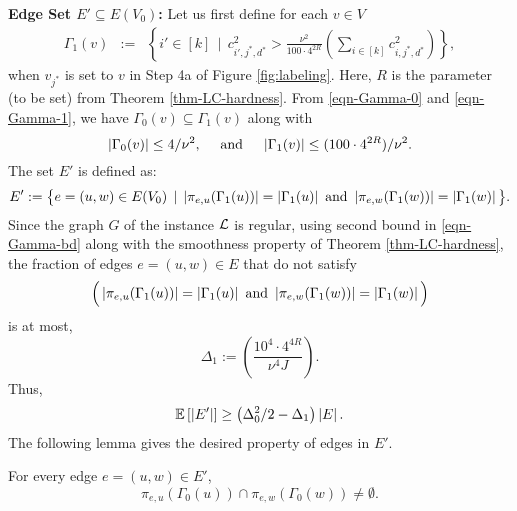 \medskip
\noindent
{\bf Edge Set $E' \subseteq E(V_0)$:} 
Let us first define for each $v \in V$
\begin{eqnarray}
\Gamma_1(v) & := & \left\{i' \in [k]\,\mid\, c_{i',j^*,d^*}^2 >
\frac{\nu^2}{100\cdot 4^{2R}}\left(\sum_{i \in [k]}
c_{i,j^*,d^*}^2\right)\right\},
\label{eqn-Gamma-1}
\end{eqnarray}
when $v_{j^*}$ is set to $v$ in Step 4a of Figure \ref{fig:labeling}.
Here,  $R$ is the parameter (to be set) from Theorem
\ref{thm-LC-hardness}.
From \eqref{eqn-Gamma-0} and \eqref{eqn-Gamma-1}, we have $\Gamma_0(v) \subseteq \Gamma_1(v)$ along with
\begin{equation}\label{eqn-Gamma-bd}
\left|\Gamma_0(v)\right| \leq 4/\nu^2, \ \ \ \tn{ and } \ \ \ \left|\Gamma_1(v)\right| \leq (100\cdot4^{2R})/\nu^2.
\end{equation}
The set $E'$ is defined as:
\begin{equation}\label{eqn-edgesEprime}
E' := \big\{e = (u,w) \in E(V_0)\,\mid\, \left|\pi_{e,u}(\Gamma_1(u))\right| = \left|\Gamma_1(u)\right|\textnormal{ and } 
\left|\pi_{e,w}(\Gamma_1(w))\right| = \left|\Gamma_1(w)\right|
\big\}.
\end{equation}
Since the graph $G$ of the instance $\mathcal{L}$ is regular, using second bound in \eqref{eqn-Gamma-bd} along with 
the smoothness property  of Theorem \ref{thm-LC-hardness}, the fraction of edges $e = (u,w) \in E$ that do not 
satisfy $$\Big(\left|\pi_{e,u}(\Gamma_1(u))\right| = \left|\Gamma_1(u)\right|\textnormal{ and } 
\left|\pi_{e,w}(\Gamma_1(w))\right| = \left|\Gamma_1(w)\right|\Big)$$ 
is at most,
$$\Delta_1 := \left(\frac{10^4\cdot 4^{4R}}{\nu^4J}\right).$$
Thus,
\begin{equation}\label{eqn-Eprimebd}
\mathbb{E}\left[\left|E'\right|\right] \geq \left(\Delta_0^2/2 - \Delta_1\right)\left|E\right|.
\end{equation}
The following lemma gives the desired property of edges in $E'$.
\begin{lemma}\label{lem-intersect-proj}
For every edge $e = (u,w) \in E'$, 
\begin{equation}\label{eqn-lem-intesect-proj}
\pi_{e,u}\left(\Gamma_0(u)\right)\cap \pi_{e,w}\left(\Gamma_0(w)\right) \neq \emptyset.
\end{equation}
\end{lemma}
